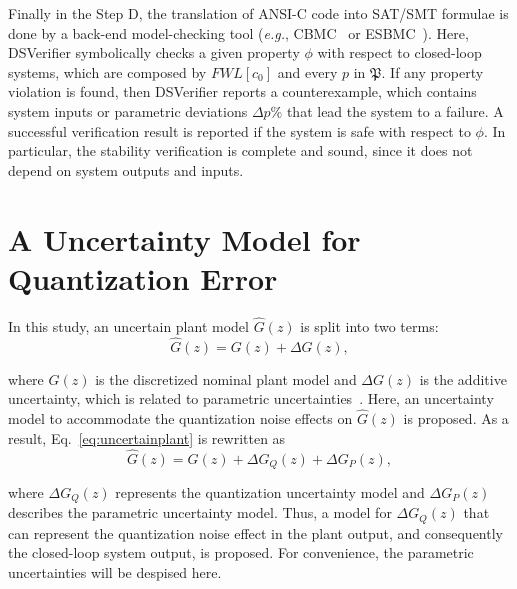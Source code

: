 \documentclass{sig-alternate-05-2015}
\begin{document}
Finally in the Step D, the translation of ANSI-C code into SAT/SMT formulae is done by a back-end model-checking tool ({\it e.g.}, CBMC~\cite{ClarkeKL04} or ESBMC~\cite{CordeiroFM12}). Here, DSVerifier symbolically checks a given property $\phi$ with respect to closed-loop systems, which are composed by $FWL[c_0]$ and every $p$ in $\mathfrak{P}$. If any property violation is found, then DSVerifier reports a counterexample, which contains system inputs or parametric deviations $\Delta{p}\%$ that lead the system to a failure. A successful verification result is reported if the system is safe with respect to $\phi$. In particular, the stability verification is complete and sound, since it does not depend on system outputs and inputs.

\section{A Uncertainty Model for Quantization Error} 
\label{sec:uncertainty-model-quantization-error}

In this study, an uncertain plant model $\hat{G}(z)$ is split into two terms:
%
\begin{equation}
\label{eq:uncertainplant}
\hat{G}(z)=G(z)+\Delta{G(z)},
\end{equation}

\noindent where $G(z)$ is the discretized nominal plant model and $\Delta{G(z)}$ is the additive uncertainty, which is related to parametric uncertainties~\cite{Bessa16}. Here, an uncertainty model to accommodate the quantization noise effects on $\hat{G}(z)$ is proposed. As a result, Eq.~\eqref{eq:uncertainplant} is rewritten as
%
\begin{equation}
\label{eq:uncertainFWLplant}
\hat{G}(z)=G(z)+\Delta{G_{Q}(z)}+\Delta{G_{P}(z)},
\end{equation}

\noindent where $\Delta{G_{Q}(z)}$ represents the quantization uncertainty model and $\Delta{G_{P}(z)}$ describes the parametric uncertainty model. Thus, a model for $\Delta{G_{Q}(z)}$ that can represent the quantization noise effect in the plant output, and consequently the closed-loop system output, is proposed. For convenience, the parametric uncertainties will be despised here.
\end{document}

